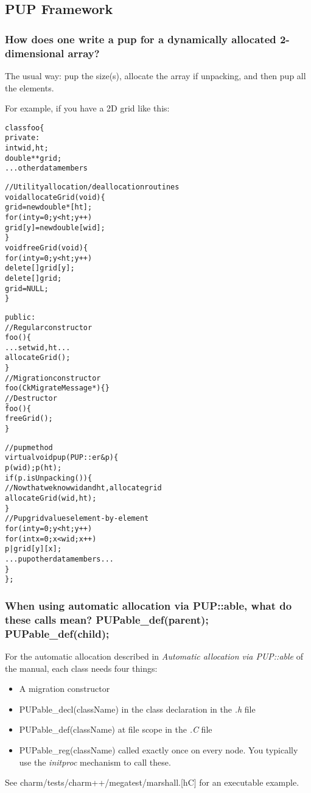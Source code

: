 \subsection{PUP Framework}

\subsubsection{How does one write a pup for a dynamically allocated 2-dimensional array?}

The usual way: pup the size(s), allocate the array if unpacking, and
then pup all the elements.

For example, if you have a 2D grid like this:
\begin{alltt}
class foo \{
 private:
  int wid,ht;
  double **grid;
  ...other data members

  //Utility allocation/deallocation routines
  void allocateGrid(void) \{
    grid=new double*[ht];
    for (int y=0;y<ht;y++)
      grid[y]=new double[wid];
  \}
  void freeGrid(void) \{
    for (int y=0;y<ht;y++)
      delete[] grid[y];
    delete[] grid;
    grid=NULL;
  \}

 public:
  //Regular constructor
  foo() \{
    ...set wid, ht...
    allocateGrid();
  \}
  //Migration constructor
  foo(CkMigrateMessage *) \{\}
  //Destructor
  \~foo() \{
    freeGrid();
  \}

  //pup method
  virtual void pup(PUP::er \&p) \{
    p(wid); p(ht);
    if (p.isUnpacking()) \{
      //Now that we know wid and ht, allocate grid
      allocateGrid(wid,ht);
    \}
    //Pup grid values element-by-element
    for (int y=0;y<ht;y++)
      for (int x=0; x<wid; x++)
        p|grid[y][x];
    ...pup other data members...
  \}
\};
\end{alltt}

\subsubsection{When using automatic allocation via PUP::able, what do these calls mean?
\textrm{PUPable\_def(parent); PUPable\_def(child);}}

For the automatic allocation described in {\em Automatic allocation via
\textrm{PUP::able}} of the manual, each class needs four things:
\begin{itemize}
\item A migration constructor

\item
\textrm{PUPable\_decl(className)} in the class declaration in the {\em .h}
file

\item
\textrm{PUPable\_def(className)} at file scope in the {\em .C} file

\item
\textrm{PUPable\_reg(className)} called exactly once on every node. You
typically use the {\em initproc} mechanism to call these.
\end{itemize}
See \textrm{charm/tests/charm++/megatest/marshall.[hC]} for an executable
example.

